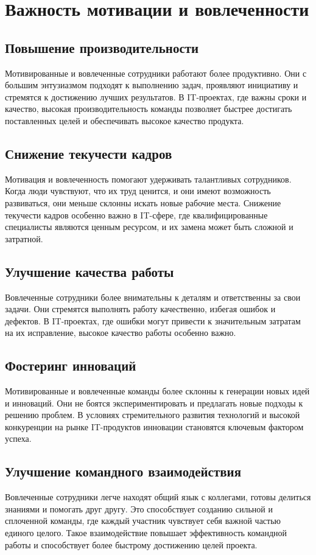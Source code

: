     \section{Важность мотивации и вовлеченности}

    \subsection*{Повышение производительности}
    Мотивированные и вовлеченные сотрудники работают более продуктивно. Они с большим энтузиазмом подходят к выполнению задач, проявляют инициативу и стремятся к достижению лучших результатов. В IT-проектах, где важны сроки и качество, высокая производительность команды позволяет быстрее достигать поставленных целей и обеспечивать высокое качество продукта.

    \subsection*{Снижение текучести кадров}
    Мотивация и вовлеченность помогают удерживать талантливых сотрудников. Когда люди чувствуют, что их труд ценится, и они имеют возможность развиваться, они меньше склонны искать новые рабочие места. Снижение текучести кадров особенно важно в IT-сфере, где квалифицированные специалисты являются ценным ресурсом, и их замена может быть сложной и затратной.
    
    \subsection*{Улучшение качества работы}
    Вовлеченные сотрудники более внимательны к деталям и ответственны за свои задачи. Они стремятся выполнять работу качественно, избегая ошибок и дефектов. В IT-проектах, где ошибки могут привести к значительным затратам на их исправление, высокое качество работы особенно важно.

    \subsection*{Фостеринг инноваций}
    Мотивированные и вовлеченные команды более склонны к генерации новых идей и инноваций. Они не боятся экспериментировать и предлагать новые подходы к решению проблем. В условиях стремительного развития технологий и высокой конкуренции на рынке IT-продуктов инновации становятся ключевым фактором успеха.

    \subsection*{Улучшение командного взаимодействия}
    Вовлеченные сотрудники легче находят общий язык с коллегами, готовы делиться знаниями и помогать друг другу. Это способствует созданию сильной и сплоченной команды, где каждый участник чувствует себя важной частью единого целого. Такое взаимодействие повышает эффективность командной работы и способствует более быстрому достижению целей проекта.

